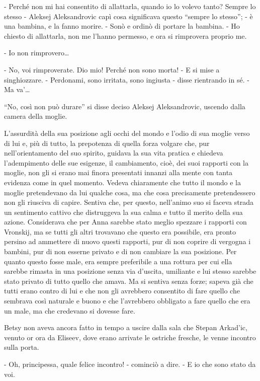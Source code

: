 - Perché non mi hai consentito di allattarla, quando io lo volevo tanto? Sempre lo stesso - Aleksej Aleksandrovic capì cosa significava questo ``sempre lo stesso''; - è una bambina, e la fanno morire. - Sonò e ordinò di portare la bambina. - Ho chiesto di allattarla, non me l'hanno permesso, e ora si rimprovera proprio me. 

- Io non rimprovero\ldots{} 

- No, voi rimproverate. Dio mio! Perché non sono morta! - E si mise a singhiozzare. - Perdonami, sono irritata, sono ingiusta - disse rientrando in sé. - Ma va'\ldots{} 

``No, così non può durare'' si disse deciso Aleksej Aleksandrovic, uscendo dalla camera della moglie. 

L'assurdità della sua posizione agli occhi del mondo e l'odio di sua moglie verso di lui e, più di tutto, la prepotenza di quella forza volgare che, pur nell'orientamento del suo spirito, guidava la sua vita pratica e chiedeva l'adempimento delle sue esigenze, il cambiamento, cioè, dei suoi rapporti con la moglie, non gli si erano mai finora presentati innanzi alla mente con tanta evidenza come in quel momento. Vedeva chiaramente che tutto il mondo e la moglie pretendevano da lui qualche cosa, ma che cosa precisamente pretendessero non gli riusciva di capire. Sentiva che, per questo, nell'animo suo si faceva strada un sentimento cattivo che distruggeva la sua calma e tutto il merito della sua azione. Considerava che per Anna sarebbe stato meglio spezzare i rapporti con Vronskij, ma se tutti gli altri trovavano che questo era possibile, era pronto persino ad ammettere di nuovo questi rapporti, pur di non coprire di vergogna i bambini, pur di non esserne privato e di non cambiare la sua posizione. Per quanto questo fosse male, era sempre preferibile a una rottura per cui ella sarebbe rimasta in una posizione senza via d'uscita, umiliante e lui stesso sarebbe stato privato di tutto quello che amava. Ma si sentiva senza forze; sapeva già che tutti erano contro di lui e che non gli avrebbero consentito di fare quello che sembrava così naturale e buono e che l'avrebbero obbligato a fare quello che era un male, ma che credevano si dovesse fare. 

Betsy non aveva ancora fatto in tempo a uscire dalla sala che Stepan Arkad'ic, venuto or ora da Eliseev, dove erano arrivate le ostriche fresche, le venne incontro sulla porta. 

- Oh, principessa, quale felice incontro! - cominciò a dire. - E io che sono stato da voi. 

